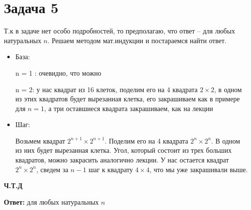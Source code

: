 \documentclass[a4paper,12pt]{article}
\author{Бурмашев Григорий, БПМИ-208}
\title{}
\date{\today}
\begin{document}
\section*{Задача 5}
Т.к в задаче нет особо подробностей, то предполагаю, что ответ -- для любых натуральных $n$. Решаем методом мат.индукции и постараемся найти ответ. 

\begin{itemize}
\item База:

n = 1 : очевидно, что можно

n = 2: у нас квадрат из 16 клеток, поделим его на 4 квадрата $2 \times 2$, в одном из этих квадратов будет вырезанная клетка, его закрашиваем как в примере для $n = 1$, а три оставшиеся квадрата закрашиваем, как на лекции

\item Шаг:

Возьмем квадрат $2^{n + 1} \times 2^{n + 1}$. Поделим его на 4 квадрата $2^n \times 2^n$. В одном из них будет вырезанная клетка. Угол, который состоит из трех больших квадратов, можно закрасить аналогично лекции. У нас остается квадрат $2^n \times 2^n$, сведем за $n - 1$ шаг к квадрату $4 \times 4$, что мы уже закрашивали выше.
\end{itemize}
\begin{center}
\textbf{Ч.Т.Д} 
\end{center}
\begin{center}
\textbf{Ответ: } для любых натуральных $n$
\end{center}
\end{document}
